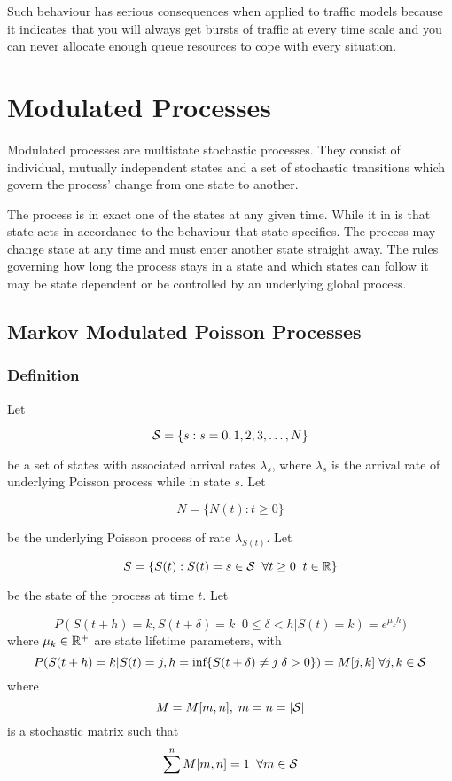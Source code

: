 Such behaviour has serious consequences when applied to traffic models
because it indicates that you will always get bursts of traffic at
every time scale and you can never allocate enough queue resources to
cope with every situation.

\section{Modulated Processes}

Modulated processes are multistate stochastic processes.  They consist
of individual, mutually independent states and a set of stochastic
transitions which govern the process' change from one state to
another.

The process is in exact one of the states at any given time.  While it
in is that state acts in accordance to the behaviour that state
specifies.  The process may change state at any time and must enter
another state straight away.  The rules governing how long the process
stays in a state and which states can follow it may be state dependent
or be controlled by an underlying global process.

\subsection{Markov Modulated Poisson Processes}

\subsubsection{Definition}

Let

\[ {\cal S} = \{s : s = 0,1,2,3,\ldots, N \} \]

be a set of states with associated arrival rates $\lambda_s$, where
$\lambda_s$ is the arrival rate of underlying Poisson process while in
state $s$.  Let

\[ N = \{ N(t) : t \geq 0 \} \]

be the underlying Poisson process of rate $\lambda_{S(t)}$.  Let

\[
S = \{ S(t) : S(t) = s \in {\cal S} \; \; \forall t \geq 0 \; \; t \in {\Bbb R} \}
\]

be the state of the process at time $t$.  Let

\[
P(S(t+h) = k, S(t + \delta) = k \;\;0 \leq \delta < h | S(t) = k) =
e^{\mu_k h})
\]
where $\mu_k \in {\Bbb R}^+$ are state lifetime parameters, with
\[
P(S(t+h) = k | S(t) = j, h = \mbox{inf}\{S(t + \delta) \neq j \; \delta >
0\}) = M[j,k] \; \forall j,k \in {\cal S}
\]
where
\[
M = M[m,n], \; m = n = |{\cal S}|
\]
is a stochastic matrix such that
\[
\sum^n M[m,n] = 1 \; \; \forall m \in {\cal S}
\]

